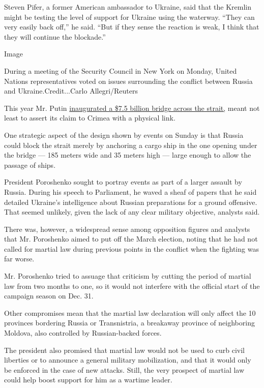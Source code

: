 Steven Pifer, a former American ambassador to Ukraine, said that the
Kremlin might be testing the level of support for Ukraine using the
waterway. ``They can very easily back off,'' he said. ``But if they
sense the reaction is weak, I think that they will continue the
blockade.''

Image

During a meeting of the Security Council in New York on Monday, United
Nations representatives voted on issues surrounding the conflict between
Russia and Ukraine.Credit...Carlo Allegri/Reuters

This year Mr. Putin
\href{https://www.nytimes.com/2018/05/15/world/europe/putin-russia-crimea-bridge.html}{inaugurated
a \$7.5 billion bridge across the strait,} meant not least to assert its
claim to Crimea with a physical link.

One strategic aspect of the design shown by events on Sunday is that
Russia could block the strait merely by anchoring a cargo ship in the
one opening under the bridge --- 185 meters wide and 35 meters high ---
large enough to allow the passage of ships.

President Poroshenko sought to portray events as part of a larger
assault by Russia. During his speech to Parliament, he waved a sheaf of
papers that he said detailed Ukraine's intelligence about Russian
preparations for a ground offensive. That seemed unlikely, given the
lack of any clear military objective, analysts said.

There was, however, a widespread sense among opposition figures and
analysts that Mr. Poroshenko aimed to put off the March election, noting
that he had not called for martial law during previous points in the
conflict when the fighting was far worse.

Mr. Poroshenko tried to assuage that criticism by cutting the period of
martial law from two months to one, so it would not interfere with the
official start of the campaign season on Dec. 31.

Other compromises mean that the martial law declaration will only affect
the 10 provinces bordering Russia or Transnistria, a breakaway province
of neighboring Moldova, also controlled by Russian-backed forces.

The president also promised that martial law would not be used to curb
civil liberties or to announce a general military mobilization, and that
it would only be enforced in the case of new attacks. Still, the very
prospect of martial law could help boost support for him as a wartime
leader.

